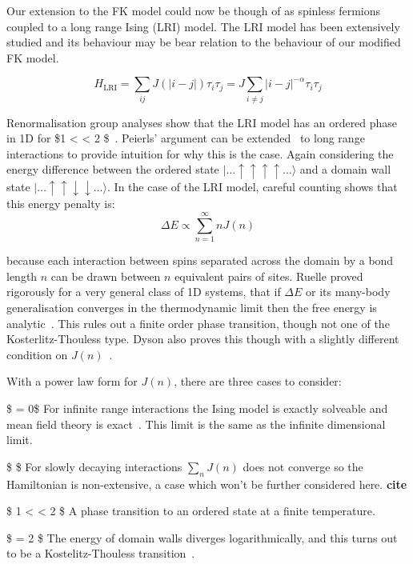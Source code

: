 Our extension to the FK model could now be though of as spinless fermions coupled to a long range Ising (LRI) model. The LRI model has been extensively studied and its behaviour may be bear relation to the behaviour of our modified FK model.

\[H_{\mathrm{LRI}} = \sum_{ij} J(|i-j|) \tau_i \tau_j = J \sum_{i\neq j} |i - j|^{-\alpha} \tau_i \tau_j\]

Renormalisation group analyses show that the LRI model has an ordered phase in 1D for \$1 \textless{} \alpha \textless{} 2 \$~\autocite{dysonExistencePhasetransitionOnedimensional1969}. Peierls' argument can be extended~\autocite{thoulessLongRangeOrderOneDimensional1969} to long range interactions to provide intuition for why this is the case. Again considering the energy difference between the ordered state \(|\ldots\uparrow\uparrow\uparrow\uparrow\ldots\rangle\) and a domain wall state \(|\ldots\uparrow\uparrow\downarrow\downarrow\ldots\rangle\). In the case of the LRI model, careful counting shows that this energy penalty is: \[\Delta E \propto \sum_{n=1}^{\infty} n J(n)\]

because each interaction between spins separated across the domain by a bond length \(n\) can be drawn between \(n\) equivalent pairs of sites. Ruelle proved rigorously for a very general class of 1D systems, that if \(\Delta E\) or its many-body generalisation converges in the thermodynamic limit then the free energy is analytic~\autocite{ruelleStatisticalMechanicsOnedimensional1968}. This rules out a finite order phase transition, though not one of the Kosterlitz-Thouless type. Dyson also proves this though with a slightly different condition on \(J(n)\)~\autocite{dysonExistencePhasetransitionOnedimensional1969}.

With a power law form for \(J(n)\), there are three cases to consider:

\$ \alpha = 0\$ For infinite range interactions the Ising model is exactly solveable and mean field theory is exact~\autocite{lipkinValidityManybodyApproximation1965}. This limit is the same as the infinite dimensional limit.

\$ \alpha {}\$ For slowly decaying interactions \(\sum_n J(n)\) does not converge so the Hamiltonian is non-extensive, a case which won't be further considered here. \textbf{cite}

\$ 1 \textless{} \alpha \textless{} 2 \$ A phase transition to an ordered state at a finite temperature.

\$ \alpha = 2 \$ The energy of domain walls diverges logarithmically, and this turns out to be a Kostelitz-Thouless transition~\autocite{thoulessLongRangeOrderOneDimensional1969}.

